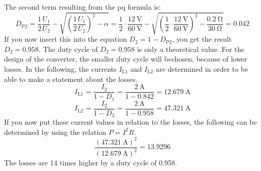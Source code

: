 \begin{solutionblock}
The second term resulting from the pq formula is:
\begin{equation}
    D_\mathrm{P2}=\frac{1}{2}\frac{U_\mathrm{1}}{U_\mathrm{2}}-\sqrt{(\frac{1}{2}\frac{U_\mathrm{1}}{U_\mathrm{2}})^2-\alpha}= \frac{1}{2}\cdot\frac{\SI{12}{\volt}}{\SI{60}{\volt}}-\sqrt{({\frac{1}{2}}\cdot\frac{\SI{12}{\volt}}{\SI{60}{\volt}})^2-\frac{\SI{0.2}{\ohm}}{\SI{30}{\ohm}}}= 0.042
\end{equation}
If you now insert this into the equation $D_\mathrm{2}=1-D_\mathrm{P2}$, you get the result $D_\mathrm{2}=0.958$.
The duty cycle of $D_\mathrm{2}=0.958$ is only a theoretical value. For the design of the converter, the smaller duty cycle will bechosen, because of lower losses.
In the following, the currents $I_\mathrm{L1}$ and $I_\mathrm{L2}$ are determined in order to be able to make a statement about the losses.
\begin{equation}
    I_\mathrm{L1} = \frac{I_\mathrm{2}}{1-D_\mathrm{1}}= \frac{\SI{2}{\ampere}}{1-0.842}=\SI{12.679}{\ampere}
\end{equation}
\begin{equation}
    I_\mathrm{L2} = \frac{I_\mathrm{2}}{1-D_\mathrm{2}}= \frac{\SI{2}{\ampere}}{1-0.958}=\SI{47.321}{\ampere}
\end{equation}
If you now put these current values in relation to the losses, the following can be determined by using the relation $P=I^2R$.
\begin{equation}
    \frac{(\SI{47.321}{\ampere})^2}{(\SI{12.679}{\ampere})^2}=13.9296
\end{equation}
The losses are 14 times higher by a duty cycle of 0.958. 



\end{solutionblock}

